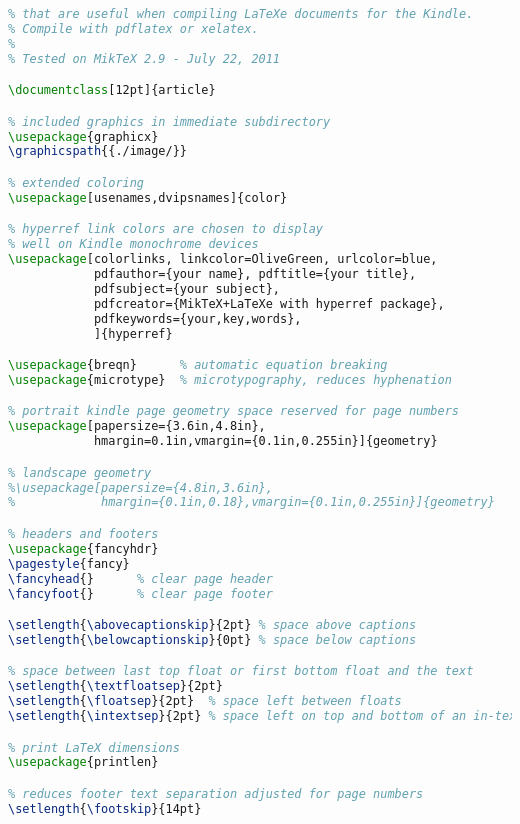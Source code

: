 \begin{tcolorbox}[breakable, size=fbox, boxrule=1pt, pad at break*=1mm,colback=cellbackground, colframe=cellborder]
\lstset{style=smallersource}
\begin{lstlisting}[language=TeX,frame=single,framerule=0pt,label=lst:scr1543X0]
% A simple test document that displays some packages and settings
% that are useful when compiling LaTeXe documents for the Kindle.
% Compile with pdflatex or xelatex.
%
% Tested on MikTeX 2.9 - July 22, 2011

\documentclass[12pt]{article}

% included graphics in immediate subdirectory
\usepackage{graphicx}
\graphicspath{{./image/}}

% extended coloring
\usepackage[usenames,dvipsnames]{color}

% hyperref link colors are chosen to display
% well on Kindle monochrome devices
\usepackage[colorlinks, linkcolor=OliveGreen, urlcolor=blue,
            pdfauthor={your name}, pdftitle={your title},
            pdfsubject={your subject},
            pdfcreator={MikTeX+LaTeXe with hyperref package},
            pdfkeywords={your,key,words},
            ]{hyperref}

\usepackage{breqn}      % automatic equation breaking
\usepackage{microtype}  % microtypography, reduces hyphenation

% portrait kindle page geometry space reserved for page numbers
\usepackage[papersize={3.6in,4.8in},
            hmargin=0.1in,vmargin={0.1in,0.255in}]{geometry}

% landscape geometry
%\usepackage[papersize={4.8in,3.6in},
%            hmargin={0.1in,0.18},vmargin={0.1in,0.255in}]{geometry}

% headers and footers
\usepackage{fancyhdr}
\pagestyle{fancy}
\fancyhead{}      % clear page header
\fancyfoot{}      % clear page footer

\setlength{\abovecaptionskip}{2pt} % space above captions
\setlength{\belowcaptionskip}{0pt} % space below captions

% space between last top float or first bottom float and the text
\setlength{\textfloatsep}{2pt} 
\setlength{\floatsep}{2pt}  % space left between floats
\setlength{\intextsep}{2pt} % space left on top and bottom of an in-text float

% print LaTeX dimensions
\usepackage{printlen}

% reduces footer text separation adjusted for page numbers
\setlength{\footskip}{14pt}


\end{lstlisting}
\end{tcolorbox}
